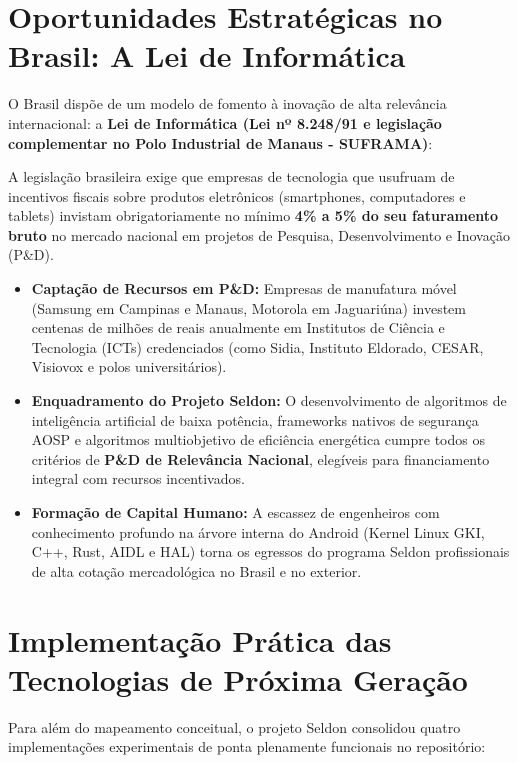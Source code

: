 \section{Oportunidades Estratégicas no Brasil: A Lei de Informática}

O Brasil dispõe de um modelo de fomento à inovação de alta relevância internacional: a \textbf{Lei de Informática (Lei nº 8.248/91 e legislação complementar no Polo Industrial de Manaus - SUFRAMA)}:

\begin{atencao}
A legislação brasileira exige que empresas de tecnologia que usufruam de incentivos fiscais sobre produtos eletrônicos (smartphones, computadores e tablets) invistam obrigatoriamente no mínimo \textbf{4\% a 5\% do seu faturamento bruto} no mercado nacional em projetos de Pesquisa, Desenvolvimento e Inovação (P\&D).
\end{atencao}

\begin{itemize}
    \item \textbf{Captação de Recursos em P\&D:} Empresas de manufatura móvel (Samsung em Campinas e Manaus, Motorola em Jaguariúna) investem centenas de milhões de reais anualmente em Institutos de Ciência e Tecnologia (ICTs) credenciados (como Sidia, Instituto Eldorado, CESAR, Visiovox e polos universitários).
    \item \textbf{Enquadramento do Projeto Seldon:} O desenvolvimento de algoritmos de inteligência artificial de baixa potência, frameworks nativos de segurança AOSP e algoritmos multiobjetivo de eficiência energética cumpre todos os critérios de \textbf{P\&D de Relevância Nacional}, elegíveis para financiamento integral com recursos incentivados.
    \item \textbf{Formação de Capital Humano:} A escassez de engenheiros com conhecimento profundo na árvore interna do Android (Kernel Linux GKI, C++, Rust, AIDL e HAL) torna os egressos do programa Seldon profissionais de alta cotação mercadológica no Brasil e no exterior.
\end{itemize}

\section{Implementação Prática das Tecnologias de Próxima Geração}
\label{sec:next_gen_implementations}

Para além do mapeamento conceitual, o projeto Seldon consolidou quatro implementações experimentais de ponta plenamente funcionais no repositório:

